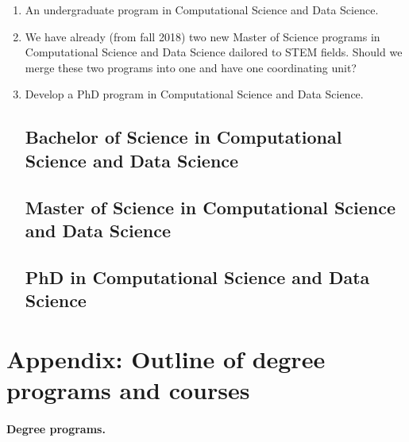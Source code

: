 \documentclass[oneside,final,10pt]{article}
\begin{document}
\begin{enumerate}
\item An undergraduate program in Computational Science and Data Science.

\item We have already (from fall 2018) two new Master of Science programs in Computational Science and Data Science dailored to STEM fields. Should we merge these two programs into one and have one coordinating unit? 

\item Develop a PhD program in Computational Science and Data Science.

\subsection*{Bachelor of Science in Computational Science and Data Science}

\subsection*{Master of Science in Computational Science and Data Science}

\subsection*{PhD in Computational Science and Data Science}


\end{enumerate}










\section*{Appendix:  Outline of degree programs and courses}



\paragraph{Degree programs.}
\end{document}
